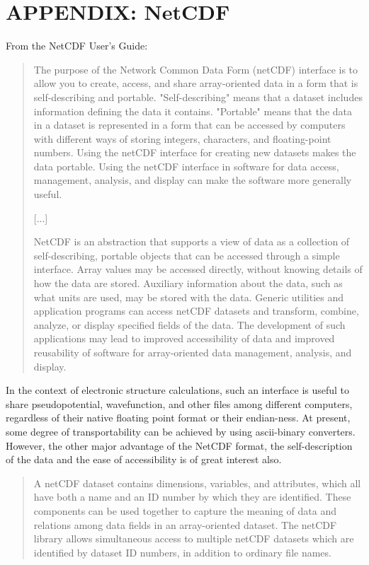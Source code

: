 \newpage
\section{APPENDIX: NetCDF}

From the NetCDF User's Guide:

\begin{quotation}
   The purpose of the Network Common Data Form (netCDF) interface is to
   allow you to create, access, and share array-oriented data in a form
   that is self-describing and portable. "Self-describing" means that a
   dataset includes information defining the data it contains. "Portable"
   means that the data in a dataset is represented in a form that can be
   accessed by computers with different ways of storing integers,
   characters, and floating-point numbers. Using the netCDF interface for
   creating new datasets makes the data portable. Using the netCDF
   interface in software for data access, management, analysis, and
   display can make the software more generally useful.

   [...]

   NetCDF is an abstraction that supports a view of data as a collection
   of self-describing, portable objects that can be accessed through a
   simple interface. Array values may be accessed directly, without
   knowing details of how the data are stored. Auxiliary information
   about the data, such as what units are used, may be stored with the
   data. Generic utilities and application programs can access netCDF
   datasets and transform, combine, analyze, or display specified fields
   of the data. The development of such applications may lead to improved
   accessibility of data and improved reusability of software for
   array-oriented data management, analysis, and display.

\end{quotation}

In the context of electronic structure calculations, such an interface
is useful to share pseudopotential, wavefunction, and other
files among different computers, regardless of their native floating
point format or their endian-ness. At present, some degree of
transportability can be achieved by using ascii-binary converters.
However, the other major advantage of the
NetCDF format, the self-description of the data and the ease of
accessibility is of great interest also.

\begin{quotation}
   A netCDF dataset contains dimensions, variables, and attributes, which
   all have both a name and an ID number by which they are identified.
   These components can be used together to capture the meaning of data
   and relations among data fields in an array-oriented dataset. The
   netCDF library allows simultaneous access to multiple netCDF datasets
   which are identified by dataset ID numbers, in addition to ordinary
   file names.
\end{quotation}

